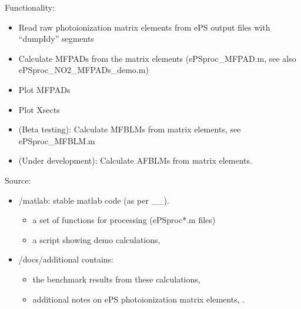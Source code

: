\documentclass[letterpaper,10pt,english]{jupyterBook}
\begin{document}
\sphinxAtStartPar
Functionality:
\begin{itemize}
\item {} 
\sphinxAtStartPar
Read raw photoionization matrix elements from ePS output files with “dumpIdy” segments

\item {} 
\sphinxAtStartPar
Calculate MF\sphinxhyphen{}PADs from the matrix elements (ePSproc\_MFPAD.m, see also ePSproc\_NO2\_MFPADs\_demo.m)

\item {} 
\sphinxAtStartPar
Plot MF\sphinxhyphen{}PADs

\item {} 
\sphinxAtStartPar
Plot X\sphinxhyphen{}sects

\item {} 
\sphinxAtStartPar
(Beta testing): Calculate MF\sphinxhyphen{}BLMs from matrix elements, see ePSproc\_MFBLM.m

\item {} 
\sphinxAtStartPar
(Under development): Calculate AF\sphinxhyphen{}BLMs from matrix elements.

\end{itemize}

\sphinxAtStartPar
Source:
\begin{itemize}
\item {} 
\sphinxAtStartPar
/matlab: stable matlab code (as per \_\_).
\begin{itemize}
\item {} 
\sphinxAtStartPar
a set of functions for processing (ePSproc*.m files)

\item {} 
\sphinxAtStartPar
a script showing demo calculations, 

\end{itemize}

\item {} 
\sphinxAtStartPar
/docs/additional contains:
\begin{itemize}
\item {} 
\sphinxAtStartPar
the benchmark results from these calculations, 

\item {} 
\sphinxAtStartPar
additional notes on ePS photoionization matrix elements, .

\end{itemize}

\end{itemize}
\end{document}
